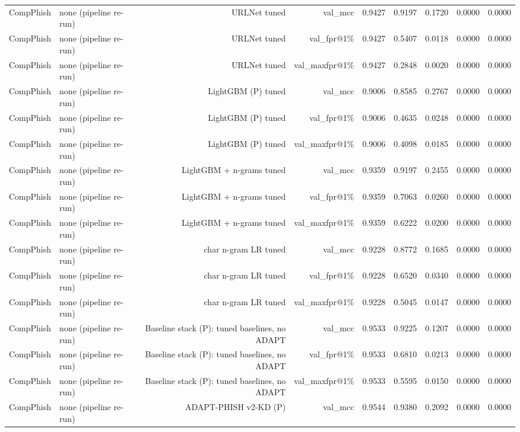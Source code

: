 \begin{table}[t]
\begin{tabular}{llrrrrrrr}
CompPhish & none (pipeline re-run) & URLNet tuned & val\_mcc & 0.9427 & 0.9197 & 0.1720 & 0.0000 & 0.0000 \\
CompPhish & none (pipeline re-run) & URLNet tuned & val\_fpr@1\% & 0.9427 & 0.5407 & 0.0118 & 0.0000 & 0.0000 \\
CompPhish & none (pipeline re-run) & URLNet tuned & val\_maxfpr@1\% & 0.9427 & 0.2848 & 0.0020 & 0.0000 & 0.0000 \\
CompPhish & none (pipeline re-run) & LightGBM (P) tuned & val\_mcc & 0.9006 & 0.8585 & 0.2767 & 0.0000 & 0.0000 \\
CompPhish & none (pipeline re-run) & LightGBM (P) tuned & val\_fpr@1\% & 0.9006 & 0.4635 & 0.0248 & 0.0000 & 0.0000 \\
CompPhish & none (pipeline re-run) & LightGBM (P) tuned & val\_maxfpr@1\% & 0.9006 & 0.4098 & 0.0185 & 0.0000 & 0.0000 \\
CompPhish & none (pipeline re-run) & LightGBM + n-grams tuned & val\_mcc & 0.9359 & 0.9197 & 0.2455 & 0.0000 & 0.0000 \\
CompPhish & none (pipeline re-run) & LightGBM + n-grams tuned & val\_fpr@1\% & 0.9359 & 0.7063 & 0.0260 & 0.0000 & 0.0000 \\
CompPhish & none (pipeline re-run) & LightGBM + n-grams tuned & val\_maxfpr@1\% & 0.9359 & 0.6222 & 0.0200 & 0.0000 & 0.0000 \\
CompPhish & none (pipeline re-run) & char n-gram LR tuned & val\_mcc & 0.9228 & 0.8772 & 0.1685 & 0.0000 & 0.0000 \\
CompPhish & none (pipeline re-run) & char n-gram LR tuned & val\_fpr@1\% & 0.9228 & 0.6520 & 0.0340 & 0.0000 & 0.0000 \\
CompPhish & none (pipeline re-run) & char n-gram LR tuned & val\_maxfpr@1\% & 0.9228 & 0.5045 & 0.0147 & 0.0000 & 0.0000 \\
CompPhish & none (pipeline re-run) & Baseline stack (P): tuned baselines, no ADAPT & val\_mcc & 0.9533 & 0.9225 & 0.1207 & 0.0000 & 0.0000 \\
CompPhish & none (pipeline re-run) & Baseline stack (P): tuned baselines, no ADAPT & val\_fpr@1\% & 0.9533 & 0.6810 & 0.0213 & 0.0000 & 0.0000 \\
CompPhish & none (pipeline re-run) & Baseline stack (P): tuned baselines, no ADAPT & val\_maxfpr@1\% & 0.9533 & 0.5595 & 0.0150 & 0.0000 & 0.0000 \\
CompPhish & none (pipeline re-run) & ADAPT-PHISH v2-KD (P) & val\_mcc & 0.9544 & 0.9380 & 0.2092 & 0.0000 & 0.0000 \\

\end{tabular}
\end{table}
